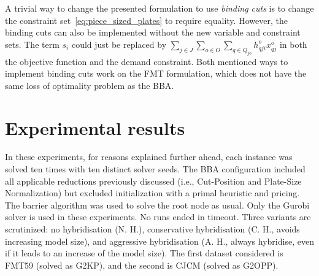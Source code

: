 \documentclass[ppgc,tese,english,formais,babel]{iiufrgs}
\begin{document}

A trivial way to change the presented formulation to use \emph{binding cuts} is to change the constraint set~\eqref{eq:piece_sized_plates} to require equality.
However, the binding cuts can also be implemented without the new variable and constraint sets.
The term \(s_i\) could just be replaced by \(\sum_{j \in J}\sum_{o \in O}\sum_{q \in Q_{jo}} h^o_{qji} x^o_{qj}\) in both the objective function and the demand constraint.
Both mentioned ways to implement binding cuts work on the FMT formulation, which does not have the same loss of optimality problem as the BBA.


\section{Experimental results}

In these experiments, for reasons explained further ahead, each instance was solved ten times with ten distinct solver seeds.
The BBA configuration included all applicable reductions previously discussed (i.e., Cut-Position and Plate-Size Normalization) but excluded initialization with a primal heuristic and pricing.
The barrier algorithm was used to solve the root node as usual.
Only the Gurobi solver is used in these experiments.
No runs ended in timeout.
Three variants are scrutinized: no hybridisation (N. H.), conservative hybridisation (C. H., avoids increasing model size), and aggressive hybridisation (A. H., always hybridise, even if it leads to an increase of the model size).
The first dataset considered is FMT59 (solved as G2KP), and the second is CJCM (solved as G2OPP).
\end{document}
